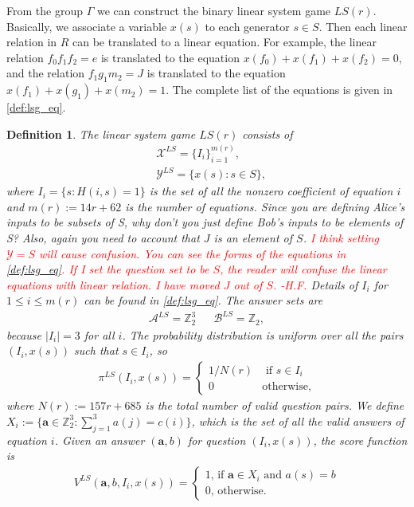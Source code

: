 \documentclass[11pt,letterpaper]{article}
\newcommand{\Z}{\mathbb{Z}}
\newcommand{\calX}{\mathcal{X}}
\newcommand{\calY}{\mathcal{Y}}
\newcommand{\calA}{\mathcal{A}}
\newcommand{\calB}{\mathcal{B}}
\newcommand{\1}{\mathbb{1}}
\newcommand{\LS}{LS}
\newcommand{\mr}{m(r)}
\newcommand{\ba}{\pmb{a}}
\def\carl#1{{\color{blue} #1}}
\newcommand{\hfc}[1]{\textcolor{red}{#1 -H.F.}}
\newtheorem{definition}[theorem]{Definition}
\theoremstyle{definition}
\begin{document}
From the group $\Gamma$ we can construct the binary linear system game $\LS(r)$. Basically,
we associate a variable $x(s)$ to each generator $s \in S$.
Then each linear relation in $R$ can be translated to a linear equation.
For example, the linear relation $f_0f_1f_2 = e$ is translated to the equation $x(f_0) + x(f_1) + x(f_2) = 0$, and the relation 
$f_1g_1m_2 = J$ is translated to the equation
$x(f_1) + x(g_1) + x(m_2) = 1$. 
The complete list of the equations is given in \cref{def:lsg_eq}.
\begin{definition}
\label{def:lsg}
The linear system game $\LS(r)$ consists of
\begin{align*}
    & \calX^{\LS} = \{I_i\}_{i=1}^{\mr}, \\
    & \calY^{\LS} = \{ x(s) : s \in S \},
\end{align*}
where $I_i = \{ s : H(i,s) = 1\}$ is the set of all the nonzero coefficient of equation $i$
and $\mr := 14r + 62$ is the number of equations.  
\carl{Since you are defining Alice's inputs to be subsets of S, why don't you just define Bob's inputs to be elements of S? Also, again you need to account that
$J$ is an element of $S$.}
\hfc{I think setting $\calY = S$ will cause confusion.
You can see the forms of the equations in \cref{def:lsg_eq}.
If I set the question set to be $S$, the reader will confuse the 
linear equations with linear relation.
I have moved $J$ out of $S$.}
Details of $I_i$ for $1 \leq i \leq \mr$ can be found in \cref{def:lsg_eq}.
The answer sets are 
\begin{align*}
    \calA^{\LS} = \Z_2^{3} && \calB^{\LS} = \Z_2,
\end{align*}
because $|I_i| = 3$ for all $i$.
The probability distribution is uniform over all the pairs $(I_i, x(s))$ such that $s \in I_i$, so
\begin{align*}
    \pi^{\LS}(I_i, x(s)) = 
    \begin{cases}
        1/N(r) & \text{ if } s \in I_i \\
        0 & \text{otherwise,}
    \end{cases}
\end{align*}
where $N(r) := 157r + 685$ is the total number of valid question pairs.
We define $X_i := \{ \ba \in \Z_2^3: \sum_{j=1}^3 a(j) = c(i) \}$, which is the set of all the valid answers of equation $i$.
Given an answer $(\ba,b)$ for question $(I_i,x(s))$, 
the score function is
\begin{align*}
    V^{\LS}(\ba, b, I_i, x(s)) = 
    \begin{cases}
        1 \text{, if } \ba \in X_i \text{ and } a(s) = b\\
        0 \text{, otherwise}.
    \end{cases}
\end{align*}
\end{definition}
\end{document}
